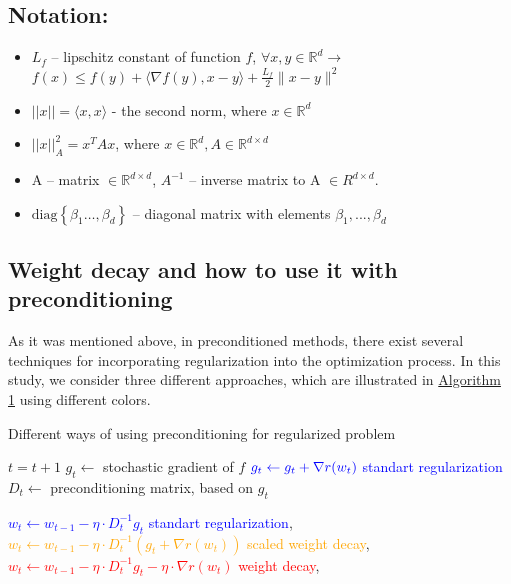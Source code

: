\documentclass[USenglish]{article}
\theoremstyle{dgthm}
\theoremstyle{dgdef}
\begin{document}
\subsection{Notation:}
\begin{itemize}
    \item $L_f$ -- lipschitz constant of function $f$, $\forall x, y \in \mathbb{R}^d \rightarrow $ 	$f(x) \leq f(y) + \langle \nabla f(y), x-y \rangle + \frac{L_f}{2} \|x - y\|^2$
    \item $|| x || = \langle x, x \rangle$  - the second norm, where $x \in \mathbb{R}^d$
    \item $|| x ||_A^2 = x^TAx$, where $x \in \mathbb{R}^d, A \in \mathbb{R}^{d \times d}$
    \item A -- matrix $\in \mathbb{R}^{d \times d}$, $A^{-1}$ -- inverse matrix to A $\in R^{d \times d}$.
    \item $\textrm{diag} \left\{ \beta_1 \ldots, \beta_d \right\}$ -- diagonal matrix with elements $\beta_1, ..., \beta_d$
    
\end{itemize}


\subsection{Weight decay and how to use it with preconditioning}
As it was mentioned above, in preconditioned methods, there exist several techniques for incorporating regularization into the optimization process.
In this study, we consider three different approaches, which are illustrated in \hyperref[alg:precond]{Algorithm 1} using different colors.

\begin{algorithm}[H]
    \caption{Different ways of using preconditioning for regularized problem}
    \label{alg:precond}
    
    \begin{algorithmic}
            
            \State $t = t+1$
            \State $g_t \gets$ stochastic gradient of $f$
            \State $\textcolor{blue}{g_t \gets g_t + \nabla r(w_t)}$ \hfill \textcolor{blue}{standart regularization}
            \State $D_t \gets$ preconditioning matrix, based on $g_t$

            \State \textcolor{blue}{$w_t \gets w_{t-1} - \eta \cdot D_t^{-1}g_t $} \hfill \textcolor{blue}{standart regularization}, 
            \State \textcolor{orange}{$w_t \gets w_{t-1} - \eta \cdot D_t^{-1} \left(g_t +\nabla r(w_t) \right)$} \hfill \textcolor{orange}{scaled weight decay}, 
            \State \textcolor{red}{$w_t \gets w_{t-1} - \eta \cdot D_t^{-1} g_t  - \eta \cdot \nabla r(w_t)$} \hfill \textcolor{red}{weight decay}, 
            \EndWhile
    \end{algorithmic}
\end{algorithm}
\end{document}
